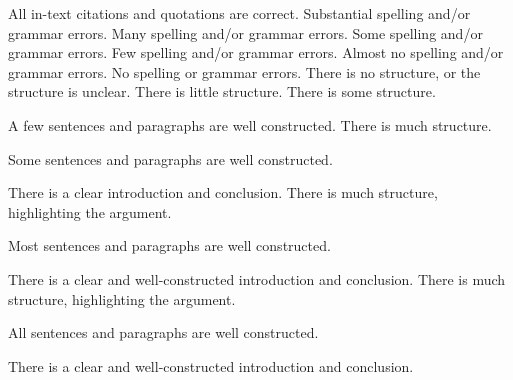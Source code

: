 \documentclass{../fal_assignment}
\begin{document}
\begin{markingrubric}
        \par 		All in-text citations and quotations are correct.
%
        \grade\fail 	Substantial spelling and/or grammar errors.
        \grade 		Many spelling and/or grammar errors.
        \grade 		Some spelling and/or grammar errors.  
        \grade 		Few spelling and/or grammar errors.
        \grade 		Almost no spelling and/or grammar errors.
        \grade 		No spelling or grammar errors.
%
        \grade\fail 	There is no structure, or the structure is unclear.
        \grade 		There is little structure.
        \grade 		There is some structure.
        \par 		A few sentences and paragraphs are well constructed.
        \grade 		There is much structure.
        \par 		Some sentences and paragraphs are well constructed.
        \par 		There is a clear introduction and conclusion.
        \grade 		There is much structure, highlighting the argument.
        \par 		Most sentences and paragraphs are well constructed.
        \par 		There is a clear and well-constructed introduction and conclusion.
        \grade 		There is much structure, highlighting the argument.
        \par 		All sentences and paragraphs are well constructed.
        \par 		There is a clear and well-constructed introduction and conclusion.
\end{markingrubric}
\end{document}

